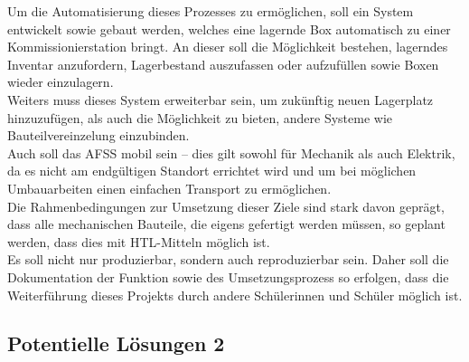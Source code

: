 Um die Automatisierung dieses Prozesses zu ermöglichen, soll ein System entwickelt sowie gebaut werden, welches eine lagernde Box automatisch zu einer Kommissionierstation bringt. An dieser soll die Möglichkeit bestehen, lagerndes Inventar anzufordern, Lagerbestand auszufassen oder aufzufüllen sowie Boxen wieder einzulagern.\\
Weiters muss dieses System erweiterbar sein, um zukünftig neuen Lagerplatz hinzuzufügen, als auch die Möglichkeit zu bieten, andere Systeme wie Bauteilvereinzelung einzubinden.\\
Auch soll das AFSS mobil sein – dies gilt sowohl für Mechanik als auch Elektrik, da es nicht am endgültigen Standort errichtet wird und um bei möglichen Umbauarbeiten einen einfachen Transport zu ermöglichen.\\
Die Rahmenbedingungen zur Umsetzung dieser Ziele sind stark davon geprägt, dass alle mechanischen Bauteile, die eigens gefertigt werden müssen, so geplant werden, dass dies mit HTL-Mitteln möglich ist.\\
Es soll nicht nur produzierbar, sondern auch reproduzierbar sein. Daher soll die Dokumentation der Funktion sowie des Umsetzungsprozess so erfolgen, dass die Weiterführung dieses Projekts durch andere Schülerinnen und Schüler möglich ist.\\



\subsection{Potentielle Lösungen 2}
